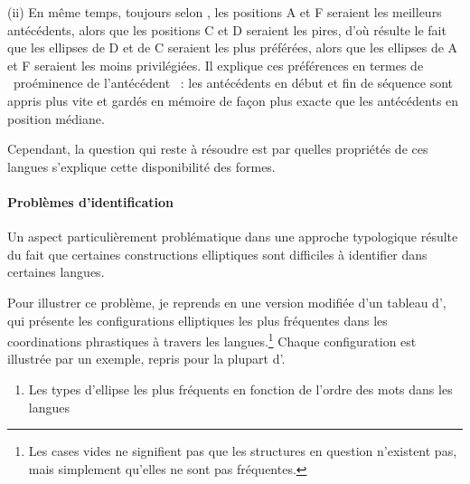 (ii) En même temps, toujours selon \citet{Sanders1977}, les positions A et F seraient les meilleurs antécédents, alors que les positions C et D seraient les pires, d'où résulte le fait que les ellipses de D et de C seraient les plus préférées, alors que les ellipses de A et F seraient les moins privilégiées. Il explique ces préférences en termes de {\guillemotleft}~proéminence de l'antécédent~{\guillemotright} : les antécédents en début et fin de séquence sont appris plus vite et gardés en mémoire de façon plus exacte que les antécédents en position médiane. 

Cependant, la question qui reste à résoudre est par quelles propriétés de ces langues s'explique cette disponibilité des formes.

\paragraph[Problèmes d'identification]{Problèmes d'identification}
Un aspect particulièrement problématique dans une approche typologique résulte du fait que certaines constructions elliptiques sont difficiles à identifier dans certaines langues.

Pour illustrer ce problème, je reprends en  une version modifiée d'un tableau d'\citet{Haspelmath2007}, qui présente les configurations elliptiques les plus fréquentes dans les coordinations phrastiques à travers les langues.\footnote{Les cases vides ne signifient pas que les structures en question n'existent pas, mais simplement qu'elles ne sont pas fréquentes.} Chaque configuration est illustrée par un exemple, repris pour la plupart d'\citet{Haspelmath2007}.


\begin{enumerate}
\item \label{bkm:Ref305339477}Les types d'ellipse les plus fréquents en fonction de l'ordre des mots dans les langues  


\end{enumerate}





